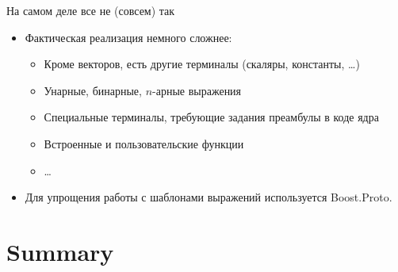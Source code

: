 \documentclass[@BEAMER_OPTIONS@]{beamer}
\begin{document}
\note{ }

\begin{frame}[fragile]{На самом деле все не (совсем) так}
    \begin{itemize}
        \item Фактическая реализация немного сложнее:
            \begin{itemize}
                \item Кроме векторов, есть другие терминалы (скаляры,
                    константы, \ldots)
                \item Унарные, бинарные, $n$-арные выражения
                \item Специальные терминалы, требующие задания
                    преамбулы в коде ядра
                \item Встроенные и пользовательские функции
                \item \ldots
            \end{itemize}
            \vspace{\baselineskip}
        \item Для упрощения работы с шаблонами выражений используется
            Boost.Proto.
    \end{itemize}
\end{frame}


\section{Summary}
\end{document}
